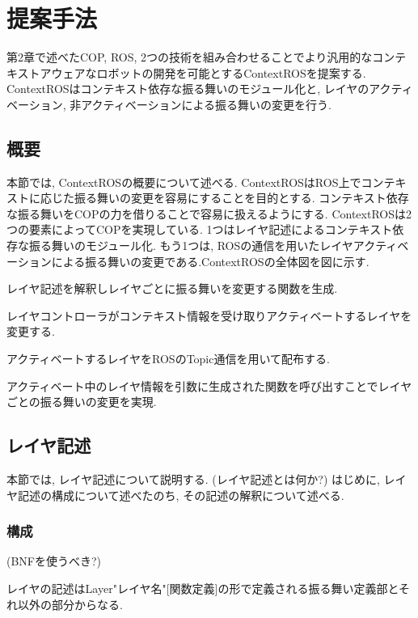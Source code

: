 
\chapter{提案手法}
\label{cha:proposed_method}
第2章で述べたCOP, ROS, 2つの技術を組み合わせることでより汎用的なコンテキストアウェアなロボットの開発を可能とするContextROSを提案する. ContextROSはコンテキスト依存な振る舞いのモジュール化と, レイヤのアクティベーション, 非アクティベーションによる振る舞いの変更を行う.
\section{概要}
本節では, ContextROSの概要について述べる. ContextROSはROS上でコンテキストに応じた振る舞いの変更を容易にすることを目的とする. コンテキスト依存な振る舞いをCOPの力を借りることで容易に扱えるようにする. ContextROSは2つの要素によってCOPを実現している. 1つはレイヤ記述によるコンテキスト依存な振る舞いのモジュール化. もう1つは, ROSの通信を用いたレイヤアクティベーションによる振る舞いの変更である.ContextROSの全体図を図に示す. \par
レイヤ記述を解釈しレイヤごとに振る舞いを変更する関数を生成. \par
レイヤコントローラがコンテキスト情報を受け取りアクティベートするレイヤを変更する. \par
アクティベートするレイヤをROSのTopic通信を用いて配布する. \par
アクティベート中のレイヤ情報を引数に生成された関数を呼び出すことでレイヤごとの振る舞いの変更を実現. \par

\section{レイヤ記述}
本節では, レイヤ記述について説明する. (レイヤ記述とは何か?)
はじめに, レイヤ記述の構成について述べたのち, その記述の解釈について述べる.

\subsection{構成}

(BNFを使うべき?)\par
レイヤの記述はLayer"レイヤ名"[関数定義]の形で定義される振る舞い定義部とそれ以外の部分からなる.


